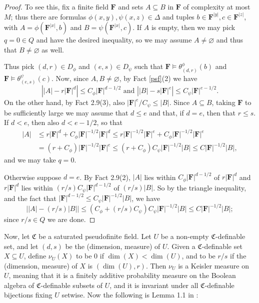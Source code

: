 \documentclass[10pt]{article}
\begin{document}
{\begin{proof}
    To see this, fix a finite field $\mathbf{F}$ and sets $A\subseteq B$ in $\mathbf{F}$ of complexity at most $M$; thus there are formulas $\phi(x,y),\psi(x,z)\in\Delta$ and tuples $b\in\mathbf{F}^{|y|},c\in\mathbf{F}^{|z|}$, with $A=\phi(\mathbf{F}^{|x|},b)$ and $B=\psi(\mathbf{F}^{|x|},c)$. If $A$ is empty, then we may pick $q=0\in Q$ and have the desired inequality, so we may assume $A\neq\varnothing$ and thus that $B\neq\varnothing$ as well.
    
    Thus pick $(d,r)\in D_\phi$ and $(e,s)\in D_\psi$ such that $\mathbf{F}\models\theta^\phi_{(d,r)}(b)$ and $\mathbf{F}\models\theta^\psi_{(e,s)}(c)$. Now, since $A,B\neq\varnothing$, by Fact \ref{psf}(2) we have $$\left||A|-r|\mathbf{F}|^d\right|\leqslant C_\phi|\mathbf{F}|^{d-1/2}\text{ and }\left||B|-s|\mathbf{F}|^e\right|\leqslant C_\psi|\mathbf{F}|^{e-1/2}.$$ On the other hand, by Fact 2.9(3), also $|\mathbf{F}|^e/C_\psi\leqslant|B|$. Since $A\subseteq B$, taking $\mathbf{F}$ to be sufficiently large we may assume that $d\leqslant e$ and that, if $d=e$, then that $r\leqslant s$. If $d<e$, then also $d<e-1/2$, so that
    \begin{align*}
        |A|&\leqslant r|\mathbf{F}|^d+C_\phi|\mathbf{F}|^{-1/2}|\mathbf{F}|^{d}\leqslant r|\mathbf{F}|^{-1/2}|\mathbf{F}|^e+C_\phi|\mathbf{F}|^{-1/2}|\mathbf{F}|^e\\
        &= (r+C_\phi)|\mathbf{F}|^{-1/2}|\mathbf{F}|^e\leqslant (r+C_\phi)C_\psi|\mathbf{F}|^{-1/2}|B|\leqslant C|\mathbf{F}|^{-1/2}|B|,
    \end{align*} and we may take $q=0$.

    Otherwise suppose $d=e$. By Fact 2.9(2), $|A|$ lies within $C_\phi|\mathbf{F}|^{d-1/2}$ of $r|\mathbf{F}|^d$ and $r|\mathbf{F}|^d$ lies within $(r/s)C_\psi|\mathbf{F}|^{d-1/2}$ of $(r/s)|B|$. So by the triangle inequality, and the fact that $|\mathbf{F}|^{d-1/2}\leqslant C_\psi|\mathbf{F}|^{-1/2}|B|$, we have $$\left||A|-(r/s)|B|\right|\leqslant (C_\phi+(r/s)C_\psi)C_\psi|\mathbf{F}|^{-1/2}|B|\leqslant C|\mathbf{F}|^{-1/2}|B|;$$ since $r/s\in Q$ we are done.
\end{proof}

Now, let $\mathfrak{C}$ be a saturated pseudofinite field. Let $U$ be a non-empty $\mathfrak{C}$-definable set, and let $(d,s)$ be the (dimension, measure) of $U$. Given a $\mathfrak{C}$-definable set $X\subseteq U$, define $\nu_U(X)$ to be $0$ if $\dim(X)<\dim(U)$, and to be $r/s$ if the (dimension, measure) of $X$ is $(\dim(U),r)$. Then $\nu_U$ is a Keisler measure on $U$, meaning that it is a finitely additive probability measure on the Boolean algebra of $\mathfrak{C}$-definable subsets of $U$, and it is invariant under all $\mathfrak{C}$-definable bijections fixing $U$ setwise. Now the following is Lemma 1.1 in \cite{pillay_starchenko}:

}
\end{document}
